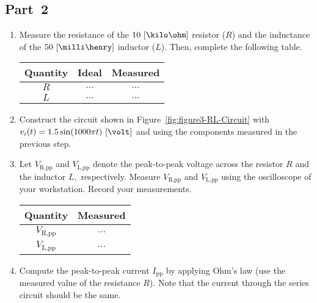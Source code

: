 \subsection{Part~2}
\label{sec:part2}
\begin{enumerate}
\item Measure the resistance of the $10~[\kilo\ohm]$ resistor ($R$) and the inductance of the $50~[\milli\henry]$ inductor ($L$). Then, complete the following table.

  \begin{center}
    \begin{tabular}{c|c|c}
      \toprule
      Quantity &  Ideal & Measured\\
      \toprule
      $R$ & $\ldots$ & $\ldots$\\   %
      $L$ & $\ldots$ & $\ldots$\\   %
      \bottomrule
    \end{tabular}    
  \end{center}
  
\item Construct the circuit shown in Figure~\ref{fig:figure3-RL-Circuit} with $v_i(t) = 1.5\sin(1000\pi t)~[\volt]$ and using the components measured in the previous step. 


\item Let $V_{\text{R,pp}}$ and $V_{\text{L,pp}}$ denote the peak-to-peak voltage across the resistor $R$ and the inductor $L,$ respectively. Measure $V_{\text{R,pp}}$ and $V_{\text{L,pp}}$ using the oscilloscope of your workstation. Record your measurements. 

  \begin{center}
    \begin{tabular}{c|c}
      \toprule
      Quantity &  Measured\\
      \toprule
      $V_{\text{R,pp}}$ & $\ldots$\\   %
      $V_{\text{L,pp}}$ & $\ldots$\\   %
      \bottomrule
    \end{tabular}    
  \end{center}
  


  
\item Compute the peak-to-peak current $I_{\text{pp}}$ by applying Ohm's law (use the measured value of the resistance $R$). Note that the current through the series circuit  should be the same. \label{item:I-L}



\end{enumerate}
